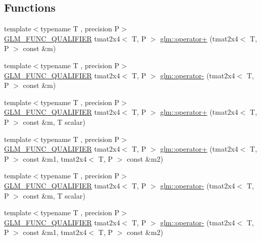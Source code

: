\subsection*{Functions}
\begin{DoxyCompactItemize}
\item 
{\footnotesize template$<$typename T , precision P$>$ }\\\mbox{\hyperlink{setup_8hpp_a33fdea6f91c5f834105f7415e2a64407}{G\+L\+M\+\_\+\+F\+U\+N\+C\+\_\+\+Q\+U\+A\+L\+I\+F\+I\+ER}} tmat2x4$<$ T, P $>$ \mbox{\hyperlink{namespaceglm_a9ebbe55e926abef0e40cffbf794f64bc}{glm\+::operator+}} (tmat2x4$<$ T, P $>$ const \&m)
\item 
{\footnotesize template$<$typename T , precision P$>$ }\\\mbox{\hyperlink{setup_8hpp_a33fdea6f91c5f834105f7415e2a64407}{G\+L\+M\+\_\+\+F\+U\+N\+C\+\_\+\+Q\+U\+A\+L\+I\+F\+I\+ER}} tmat2x4$<$ T, P $>$ \mbox{\hyperlink{namespaceglm_a213179e047320d6b697ff765b358471d}{glm\+::operator-\/}} (tmat2x4$<$ T, P $>$ const \&m)
\item 
{\footnotesize template$<$typename T , precision P$>$ }\\\mbox{\hyperlink{setup_8hpp_a33fdea6f91c5f834105f7415e2a64407}{G\+L\+M\+\_\+\+F\+U\+N\+C\+\_\+\+Q\+U\+A\+L\+I\+F\+I\+ER}} tmat2x4$<$ T, P $>$ \mbox{\hyperlink{namespaceglm_a58df05b620ccc7a06ac8a1f6d96a695e}{glm\+::operator+}} (tmat2x4$<$ T, P $>$ const \&m, T scalar)
\item 
{\footnotesize template$<$typename T , precision P$>$ }\\\mbox{\hyperlink{setup_8hpp_a33fdea6f91c5f834105f7415e2a64407}{G\+L\+M\+\_\+\+F\+U\+N\+C\+\_\+\+Q\+U\+A\+L\+I\+F\+I\+ER}} tmat2x4$<$ T, P $>$ \mbox{\hyperlink{namespaceglm_ad38e1685b1567e6b9085d474b7331b92}{glm\+::operator+}} (tmat2x4$<$ T, P $>$ const \&m1, tmat2x4$<$ T, P $>$ const \&m2)
\item 
{\footnotesize template$<$typename T , precision P$>$ }\\\mbox{\hyperlink{setup_8hpp_a33fdea6f91c5f834105f7415e2a64407}{G\+L\+M\+\_\+\+F\+U\+N\+C\+\_\+\+Q\+U\+A\+L\+I\+F\+I\+ER}} tmat2x4$<$ T, P $>$ \mbox{\hyperlink{namespaceglm_a40136e4334d6cfccf0540552e7a21dc9}{glm\+::operator-\/}} (tmat2x4$<$ T, P $>$ const \&m, T scalar)
\item 
{\footnotesize template$<$typename T , precision P$>$ }\\\mbox{\hyperlink{setup_8hpp_a33fdea6f91c5f834105f7415e2a64407}{G\+L\+M\+\_\+\+F\+U\+N\+C\+\_\+\+Q\+U\+A\+L\+I\+F\+I\+ER}} tmat2x4$<$ T, P $>$ \mbox{\hyperlink{namespaceglm_ab0e4ee4a08d22d35213dd50729bbfd3c}{glm\+::operator-\/}} (tmat2x4$<$ T, P $>$ const \&m1, tmat2x4$<$ T, P $>$ const \&m2)

\end{DoxyCompactItemize}
